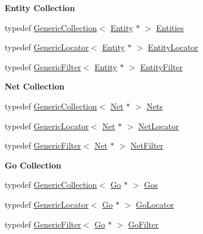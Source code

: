 \begin{Indent}\textbf{ Entity Collection}\par
\begin{DoxyCompactItemize}
\item 
typedef \mbox{\hyperlink{classHurricane_1_1GenericCollection}{Generic\+Collection}}$<$ \mbox{\hyperlink{classHurricane_1_1Entity}{Entity}} $\ast$ $>$ \mbox{\hyperlink{namespaceHurricane_af50ef2888fd2a5b58b0de14cdfaabc56}{Entities}}
\item 
typedef \mbox{\hyperlink{classHurricane_1_1GenericLocator}{Generic\+Locator}}$<$ \mbox{\hyperlink{classHurricane_1_1Entity}{Entity}} $\ast$ $>$ \mbox{\hyperlink{namespaceHurricane_ad3f039057bc40adfd993d83ace24fb83}{Entity\+Locator}}
\item 
typedef \mbox{\hyperlink{classHurricane_1_1GenericFilter}{Generic\+Filter}}$<$ \mbox{\hyperlink{classHurricane_1_1Entity}{Entity}} $\ast$ $>$ \mbox{\hyperlink{namespaceHurricane_af0fe741a1ef28dedcb26bf979b1dea5c}{Entity\+Filter}}
\end{DoxyCompactItemize}
\end{Indent}
\begin{Indent}\textbf{ Net Collection}\par
\begin{DoxyCompactItemize}
\item 
typedef \mbox{\hyperlink{classHurricane_1_1GenericCollection}{Generic\+Collection}}$<$ \mbox{\hyperlink{classHurricane_1_1Net}{Net}} $\ast$ $>$ \mbox{\hyperlink{namespaceHurricane_a3404a8b17130a1824f4a281704b04df7}{Nets}}
\item 
typedef \mbox{\hyperlink{classHurricane_1_1GenericLocator}{Generic\+Locator}}$<$ \mbox{\hyperlink{classHurricane_1_1Net}{Net}} $\ast$ $>$ \mbox{\hyperlink{namespaceHurricane_a2911512d442f8332c3cd3a135332cc02}{Net\+Locator}}
\item 
typedef \mbox{\hyperlink{classHurricane_1_1GenericFilter}{Generic\+Filter}}$<$ \mbox{\hyperlink{classHurricane_1_1Net}{Net}} $\ast$ $>$ \mbox{\hyperlink{namespaceHurricane_a0dfd2c5b40325a919d139091312732e9}{Net\+Filter}}
\end{DoxyCompactItemize}
\end{Indent}
\begin{Indent}\textbf{ Go Collection}\par
\begin{DoxyCompactItemize}
\item 
typedef \mbox{\hyperlink{classHurricane_1_1GenericCollection}{Generic\+Collection}}$<$ \mbox{\hyperlink{classHurricane_1_1Go}{Go}} $\ast$ $>$ \mbox{\hyperlink{namespaceHurricane_a4456a34f3bc6766d471c3064ace19759}{Gos}}
\item 
typedef \mbox{\hyperlink{classHurricane_1_1GenericLocator}{Generic\+Locator}}$<$ \mbox{\hyperlink{classHurricane_1_1Go}{Go}} $\ast$ $>$ \mbox{\hyperlink{namespaceHurricane_ab7d66a25194b15d7646c93bcc1b15fc8}{Go\+Locator}}
\item 
typedef \mbox{\hyperlink{classHurricane_1_1GenericFilter}{Generic\+Filter}}$<$ \mbox{\hyperlink{classHurricane_1_1Go}{Go}} $\ast$ $>$ \mbox{\hyperlink{namespaceHurricane_a372aada7b76742fd900d0bb2c5398e0c}{Go\+Filter}}
\end{DoxyCompactItemize}
\end{Indent}
